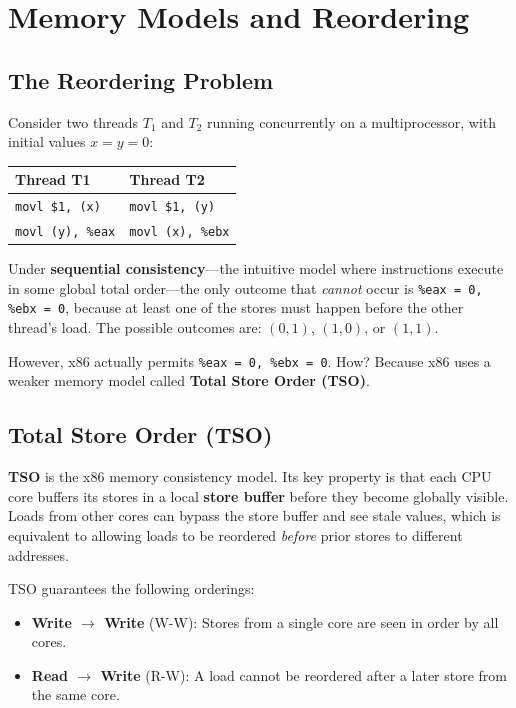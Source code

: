 \documentclass[11pt]{article}
\begin{document}
\section{Memory Models and Reordering}
\label{sec:memory-models}

\subsection{The Reordering Problem}

Consider two threads $T_1$ and $T_2$ running concurrently on a multiprocessor, with initial values $x = y = 0$:

\begin{center}
\begin{tabular}{ll}
\toprule
\textbf{Thread T1} & \textbf{Thread T2} \\
\midrule
\texttt{movl \$1, (x)} & \texttt{movl \$1, (y)} \\
\texttt{movl (y), \%eax} & \texttt{movl (x), \%ebx} \\
\bottomrule
\end{tabular}
\end{center}

Under \textbf{sequential consistency}---the intuitive model where instructions execute in some global total order---the only outcome that \emph{cannot} occur is \texttt{\%eax = 0, \%ebx = 0}, because at least one of the stores must happen before the other thread's load. The possible outcomes are: $(0,1)$, $(1,0)$, or $(1,1)$.

However, x86 actually permits \texttt{\%eax = 0, \%ebx = 0}. How? Because x86 uses a weaker memory model called \textbf{Total Store Order (TSO)}.

\subsection{Total Store Order (TSO)}

\textbf{TSO} is the x86 memory consistency model. Its key property is that each CPU core buffers its stores in a local \textbf{store buffer} before they become globally visible. Loads from other cores can bypass the store buffer and see stale values, which is equivalent to allowing loads to be reordered \emph{before} prior stores to different addresses.

TSO guarantees the following orderings:
\begin{itemize}
    \item \textbf{Write $\to$ Write} (W-W): Stores from a single core are seen in order by all cores.
    \item \textbf{Read $\to$ Write} (R-W): A load cannot be reordered after a later store from the same core.
\end{itemize}
\end{document}
